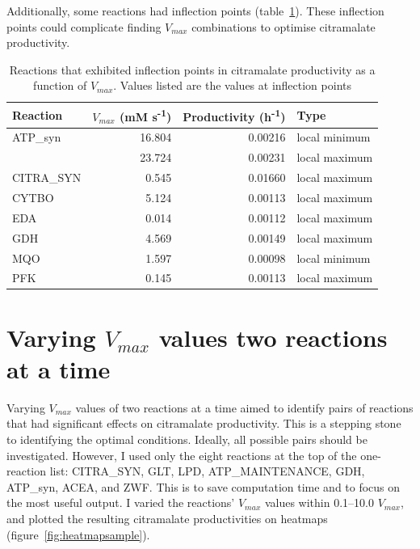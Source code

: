 \documentclass[parskip=full, numbers=noenddot]{scrreprt}
\begin{document}
Additionally, some reactions had inflection points (table~\ref{tab:inflection}). These inflection points could complicate finding $V_{max}$ combinations to optimise citramalate productivity.

\begin{table}[h]
  \caption{Reactions that exhibited inflection points in citramalate productivity as a function of $V_{max}$. Values listed are the values at inflection points}
  \label{tab:inflection}
  \centering
  \begin{tabular}{lrrl}
    \toprule
    Reaction & $V_{max}$ (mM s\textsuperscript{-1}) & Productivity (h\textsuperscript{-1}) & Type\\
    \midrule
    ATP\_syn & 16.804 & 0.00216 & local minimum\\
    & 23.724 & 0.00231 & local maximum\\
    CITRA\_SYN & 0.545 & 0.01660 & local maximum\\
    CYTBO & 5.124 & 0.00113 & local maximum\\
    EDA & 0.014 & 0.00112 & local maximum\\
    GDH & 4.569 & 0.00149 & local maximum\\
    MQO & 1.597 & 0.00098 & local minimum\\
    PFK & 0.145 & 0.00113 & local maximum\\
    \bottomrule
  \end{tabular}
\end{table}


\section{Varying $V_{max}$ values two reactions at a time}
\label{sec:couples}

Varying $V_{max}$ values of two reactions at a time aimed to identify pairs of reactions that had significant effects on citramalate productivity. This is a stepping stone to identifying the optimal conditions. Ideally, all possible pairs should be investigated. However, I used only the eight reactions at the top of the one-reaction list: CITRA\_SYN, GLT, LPD, ATP\_MAINTENANCE, GDH, ATP\_syn, ACEA, and ZWF. This is to save computation time and to focus on the most useful output. I varied the reactions' $V_{max}$ values within 0.1--10.0 $V_{max}$, and plotted the resulting citramalate productivities on heatmaps (figure~\ref{fig:heatmapsample}). %
\end{document}
